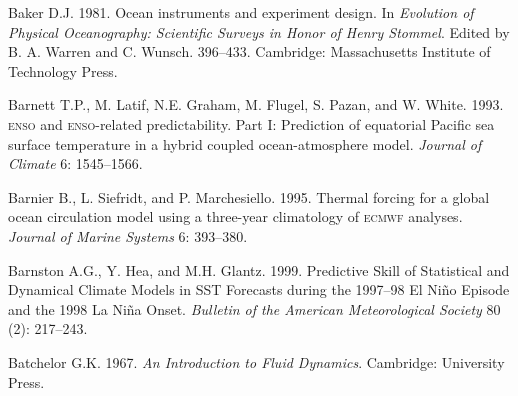 \begin{thebibliography}{999}
Baker D.J.  1981. Ocean instruments and experiment design. In
\textit{Evolution of Physical Oceanography: Scientific Surveys in
  Honor of Henry Stommel}. Edited by B. A. Warren and
C. Wunsch. 396--433. Cambridge: Massachusetts Institute of Technology
Press.
%

Barnett T.P., M. Latif, N.E. Graham, M. Flugel, S. Pazan, and
W. White.  1993. \textsc{enso} and \textsc{enso}-related
predictability. Part I: Prediction of equatorial Pacific sea surface
temperature in a hybrid coupled ocean-atmosphere
model. \textit{Journal of Climate} 6: 1545--1566.
%

Barnier B., L. Siefridt, and P. Marchesiello.  1995. Thermal forcing
for a global ocean circulation model using a three-year climatology of
\textsc{ecmwf} analyses. \textit{Journal of Marine Systems} 6:
393--380.
%

Barnston A.G., Y. Hea, and M.H. Glantz.  1999. Predictive Skill of
Statistical and Dynamical Climate Models in SST Forecasts during the
1997--98 El Ni\~{n}o Episode and the 1998 La Ni\~{n}a
Onset. \textit{Bulletin of the American Meteorological Society} 80
(2): 217--243.
%

Batchelor G.K.  1967. \textit{An Introduction to Fluid Dynamics}.
Cambridge: University Press.
%


\end{thebibliography}
